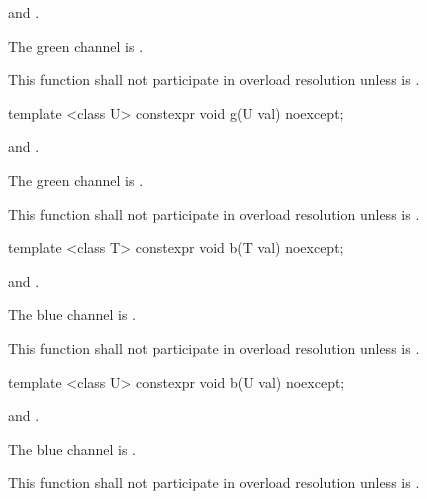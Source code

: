 \begin{itemdescr}
\pnum
\requires
{} and .

\pnum
\effects
The green channel is .

\pnum
\remarks
This function shall not participate in overload resolution unless  is .
\end{itemdescr}

%
\begin{itemdecl}
template <class U>
constexpr void g(U val) noexcept;
\end{itemdecl}
\begin{itemdescr}
\pnum
\requires
{} and .

\pnum
\effects
The green channel is .

\pnum
\remarks
This function shall not participate in overload resolution unless  is .
\end{itemdescr}

%
\begin{itemdecl}
template <class T>
constexpr void b(T val) noexcept;
\end{itemdecl}
\begin{itemdescr}
\pnum
\requires
{} and .

\pnum
\effects
The blue channel is .

\pnum
\remarks
This function shall not participate in overload resolution unless  is .
\end{itemdescr}

%
\begin{itemdecl}
template <class U>
constexpr void b(U val) noexcept;
\end{itemdecl}
\begin{itemdescr}
\pnum
\requires
{} and .

\pnum
\effects
The blue channel is .

\pnum
\remarks
This function shall not participate in overload resolution unless  is .
\end{itemdescr}

